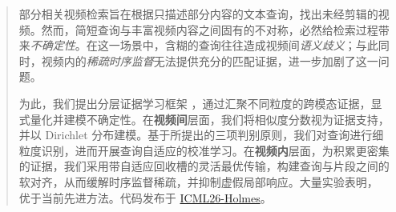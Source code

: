 \begin{abstract}
部分相关视频检索旨在根据只描述部分内容的文本查询，找出未经剪辑的视频。然而，简短查询与丰富视频内容之间固有的不对称，必然给检索过程带来\emph{不确定性}。在这一场景中，含糊的查询往往造成视频间\emph{语义歧义}；与此同时，视频内的\emph{稀疏时序监督}无法提供充分的匹配证据，进一步加剧了这一问题。

为此，我们提出分层证据学习框架 \modelname{}，通过汇聚不同粒度的跨模态证据，显式量化并建模不确定性。在\textbf{视频间}层面，我们将相似度分数视为证据支持，并以 Dirichlet 分布建模。基于所提出的三项判别原则，我们对查询进行细粒度识别，进而开展查询自适应的校准学习。在\textbf{视频内}层面，为积累更密集的证据，我们采用带自适应回收槽的灵活最优传输，构建查询与片段之间的软对齐，从而缓解时序监督稀疏，并抑制虚假局部响应。大量实验表明，\modelname{} 优于当前先进方法。代码发布于 \href{https://github.com/lijun2005/ICML26-Holmes}{ICML26-Holmes}。
\end{abstract}